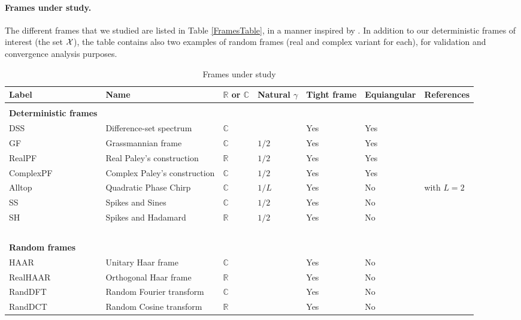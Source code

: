 \documentclass[a4paper,12pt]{article}
\newcommand{\TODO}[1]{ {\tt \color{red} [TODO:#1] } }
\newcommand{\R}{\ensuremath{\mathbb{R}}}
\newcommand{\C}{\ensuremath{\mathbb{C}}}
\begin{document}
\paragraph{Frames under study.} 

The different frames that we studied are listed in Table \ref{FramesTable},
in a manner inspired by \cite{Monajemi}.
In addition to our deterministic frames of interest 
(the set ${\cal X}$),
the table contains also two examples of random frames
(real and complex variant for each), 
for validation and convergence analysis purposes.
%
\begin{table}[t]
\centering
\caption{Frames under study}
\label{FramesTable}
{\scriptsize
\begin{tabular}{lllllll}
\toprule
Label & Name & $\R$ or $\C$ & Natural $\gamma$ & Tight frame &
Equiangular & References \\
\midrule
& & & & &  & \\
{\bf Deterministic frames} & & & & &  & \\
DSS & Difference-set spectrum & $\C$  & & Yes & Yes & \cite{WBdss}\\
GF & Grassmannian frame & $\C$ & $1/2$& Yes & Yes &  \cite[Cor. 2.6b]{Grassmannian}
\\
RealPF & Real Paley's construction & $\R$ & $1/2$ & Yes & Yes & \cite[Cor. 2.6a]{Grassmannian}
\\
ComplexPF & Complex Paley's construction & $\C$ & $1/2$ & Yes & Yes & 
\cite{PaleyConstruction}
\\
Alltop & Quadratic Phase Chirp & $\C$ & $1/L$ & Yes & No &  
\cite[eq. S4]{Monajemi} with $L=2$
\\
SS & Spikes and Sines & $\C$ & $1/2$ & Yes & No & \cite{Elad2010} \\
SH & Spikes and Hadamard & $\R$  & $1/2$ & Yes & No & \cite{Elad2010}
~ \\\hline  ~\\
{\bf Random frames} & & & & &  & \\
HAAR %
& Unitary Haar frame & $\C$ & & Yes & No & \cite{Farrell,Edelman} \\
RealHAAR %
& Orthogonal Haar frame & $\R$ & & Yes & No & \cite{Edelman} \\
RandDFT  %
& Random Fourier transform & $\C$ & & Yes & No & \cite{Farrell} \\
RandDCT  %
& Random Cosine transform & $\R$ & & Yes & No &  \\

\bottomrule
\end{tabular}
}
\label{frames:tab}
\end{table}
\end{document}
